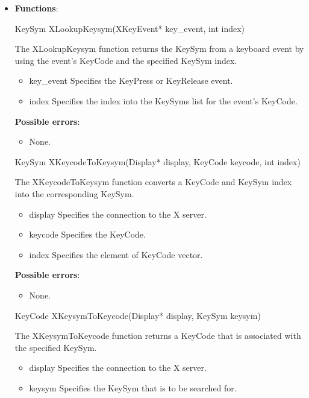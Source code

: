\documentclass{report}
\begin{document}
    \pagebreak 
    \begin{itemize}
    \item \textbf{Functions}:
        \begin{cppcode}
        KeySym XLookupKeysym(XKeyEvent* key_event, int index)
        \end{cppcode}
        \bigbreak \noindent
        The XLookupKeysym function returns the KeySym from a keyboard event by using the event's KeyCode and the specified KeySym index.
        \begin{itemize}
            \item key\_event Specifies the KeyPress or KeyRelease event.
            \item index Specifies the index into the KeySyms list for the event’s KeyCode.
        \end{itemize}

        \textbf{Possible errors}:
        \begin{itemize}
            \item None.
        \end{itemize}

        \begin{cppcode}
        KeySym XKeycodeToKeysym(Display* display, KeyCode keycode, int index)
        \end{cppcode}
        \bigbreak \noindent
        The XKeycodeToKeysym function converts a KeyCode and KeySym index into the corresponding KeySym.
        \begin{itemize}
            \item display Specifies the connection to the X server.
            \item keycode Specifies the KeyCode.
            \item index Specifies the element of KeyCode vector.
        \end{itemize}

        \textbf{Possible errors}:
        \begin{itemize}
            \item None.
        \end{itemize}

        \begin{cppcode}
        KeyCode XKeysymToKeycode(Display* display, KeySym keysym)
        \end{cppcode}
        \bigbreak \noindent
        The XKeysymToKeycode function returns a KeyCode that is associated with the specified KeySym.
        \begin{itemize}
            \item display Specifies the connection to the X server.
            \item keysym Specifies the KeySym that is to be searched for.
        \end{itemize}


\end{itemize}
\end{document}
